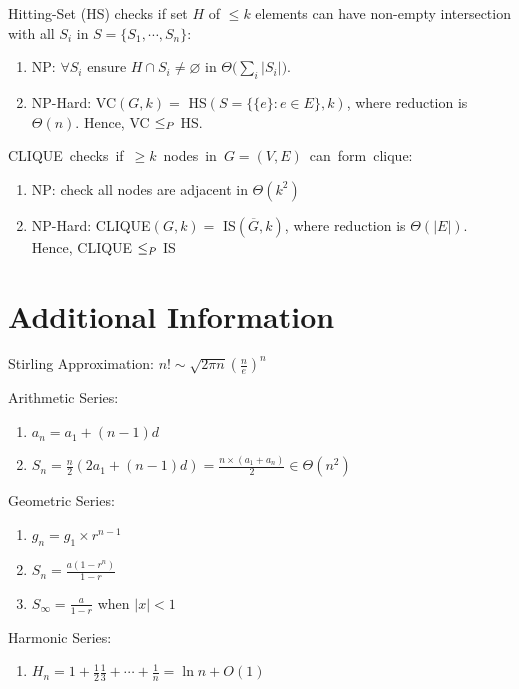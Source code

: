 \documentclass[12pt, a4paper]{article}
\begin{document}
\begin{multicols*}{3}
Hitting-Set (HS) checks if set $H$ of $\leq k$ elements can have non-empty intersection with all $S_i$ in $S =\{S_1,\cdots,S_n\}$:
\begin{enumerate}[\roman*]
  \item NP: $\forall S_i$ ensure $H\cap S_i\neq\varnothing$ in $\Theta\bigl(\sum_i|S_i|\bigr)$.
  \item NP-Hard: VC$(G, k) =$ HS$(S = \{ \{e\} : e \in E\} , k)$, where reduction is $\Theta(n)$. Hence, VC $\leq_{P}$ HS.
\end{enumerate}

\mbox{CLIQUE checks if $\geq k$ nodes in $G = (V, E)$ can form clique:}
\begin{enumerate}[\roman*.]
  \item NP: check all nodes are adjacent in $\Theta(k^2)$
  \item NP-Hard: CLIQUE$(G, k) =$ IS$(\overline{G}, k)$, where reduction is $\Theta(|E|)$. Hence, CLIQUE $\leq_{P}$ IS
\end{enumerate}
\colbreak
\section*{Additional Information}

Stirling Approximation: $n! \sim \sqrt{2\pi n}(\frac{n}{e})^n$

Arithmetic Series:
\begin{enumerate}[\roman*.]
  \item $a_n = a_1 + (n-1)d$
  \item $S_n = \frac{n}{2}(2a_1 + (n-1)d) = \frac{n \times (a_1+a_n)}{2} \in \Theta(n^2)$
\end{enumerate}

Geometric Series:
\begin{enumerate}[\roman*.]
  \item $g_n = g_1\times r^{n-1}$
  \item $S_n = \frac{a(1-r^n)}{1-r}$
  \item $S_\infty = \frac{a}{1-r}$ when $|x| < 1$
\end{enumerate}

Harmonic Series:
\begin{enumerate}[\roman*.]
  \item $H_n =1 + \frac{1}{2} \frac{1}{3} + \cdots + \frac{1}{n} = \ln n + O(1)$
\end{enumerate}



\end{multicols*}
\end{document}
